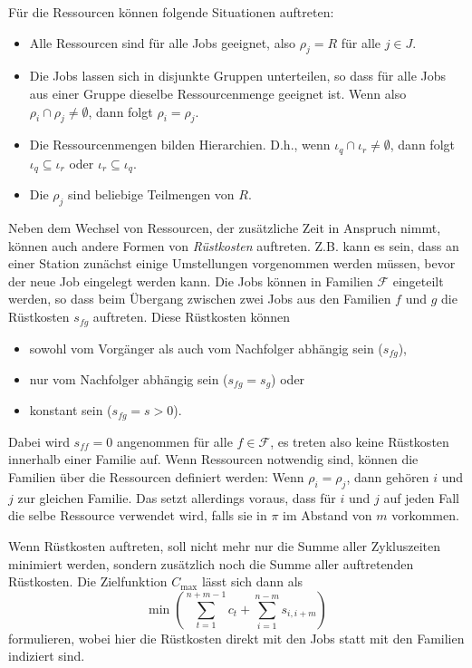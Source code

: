 \documentclass{scrreprt}
\begin{document}
Für die Ressourcen können folgende Situationen auftreten:
\begin{itemize}
    \item Alle Ressourcen sind für alle Jobs geeignet, also $\rho_j=R$ für alle $j\in J$.
    \item Die Jobs lassen sich in disjunkte Gruppen unterteilen, so dass für alle Jobs aus einer Gruppe dieselbe Ressourcenmenge geeignet ist.
        Wenn also $\rho_i \cap \rho_j \neq \emptyset$, dann folgt $\rho_i=\rho_j$.
    \item Die Ressourcenmengen bilden Hierarchien. 
        D.h., wenn $\iota_q \cap \iota_r \neq \emptyset$, dann folgt $\iota_q \subseteq \iota_r$ oder $\iota_r \subseteq \iota_q$.
    \item Die $\rho_j$ sind beliebige Teilmengen von $R$.
\end{itemize}%
Neben dem Wechsel von Ressourcen, der zusätzliche Zeit in Anspruch nimmt, können auch andere Formen von \textit{Rüstkosten}
auftreten. Z.B. kann es sein, dass an einer Station zunächst einige Umstellungen vorgenommen werden müssen, bevor der
neue Job eingelegt werden kann. Die Jobs können in Familien $\mathcal{F}$ eingeteilt werden, so dass beim Übergang
zwischen zwei Jobs aus den Familien $f$ und $g$ die Rüstkosten $s_{fg}$ auftreten.
Diese Rüstkosten können 
\begin{itemize}
    \item sowohl vom Vorgänger als auch vom Nachfolger abhängig sein ($s_{fg}$), 
    \item nur vom Nachfolger abhängig sein ($s_{fg} = s_{g}$) oder
    \item konstant sein ($s_{fg} = s > 0$).
\end{itemize}%
Dabei wird $s_{ff} = 0$ angenommen für alle $f\in\mathcal{F}$, es treten also keine Rüstkosten innerhalb einer Familie auf.
Wenn Ressourcen notwendig sind, können die Familien über die Ressourcen definiert werden:
Wenn $\rho_i=\rho_j$, dann gehören $i$ und $j$ zur gleichen Familie.
Das setzt allerdings voraus, dass für $i$ und $j$ auf jeden Fall die selbe Ressource verwendet wird, falls sie in $\pi$ im Abstand von $m$ vorkommen.

Wenn Rüstkosten auftreten, soll nicht mehr nur die Summe aller Zykluszeiten minimiert werden, sondern zusätzlich noch die Summe aller auftretenden Rüstkosten.
Die Zielfunktion $C_{\max}$ lässt sich dann als 
\[ \min\left(\sum_{t=1}^{n+m-1}c_t +\sum_{i=1}^{n-m}s_{i,i+m}\right) \] 
formulieren, wobei hier die Rüstkosten direkt mit den Jobs statt mit den Familien indiziert sind.
\end{document}
